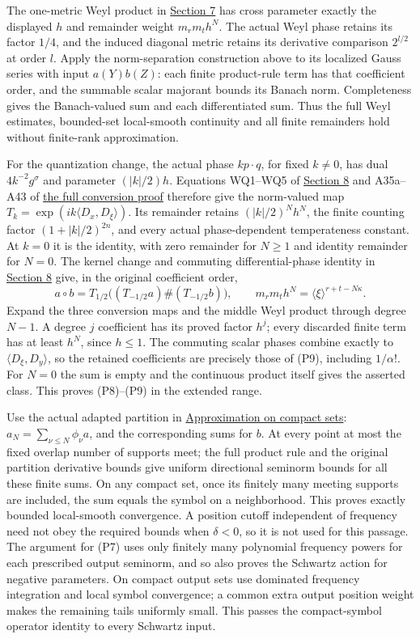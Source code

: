 \documentclass[
  11pt,
]{article}
\begin{document}
The one-metric Weyl product in
\href{weyl-metric-products.pdf\#section*.72}{Section
7} has cross parameter exactly the displayed \(h\) and remainder weight
\(m_rm_th^N\). The actual Weyl phase retains its factor \(1/4\), and the
induced diagonal metric retains its derivative comparison \(2^{l/2}\) at
order \(l\). Apply the norm-separation construction above to its
localized Gauss series with input \(a(Y)b(Z)\): each finite product-rule
term has that coefficient order, and the summable scalar majorant bounds
its Banach norm. Completeness gives the Banach-valued sum and each
differentiated sum. Thus the full Weyl estimates, bounded-set
local-smooth continuity and all finite remainders hold without
finite-rank approximation.

For the quantization change, the actual phase \(kp\cdot q\), for fixed
\(k\ne0\), has dual \(4k^{-2}g^\sigma\) and parameter \((|k|/2)h\).
Equations WQ1--WQ5 of
\href{weyl-metric-products.pdf\#section*.88}{Section
8} and A35a--A43 of
\href{weyl-covariance-action.pdf\#section*.49}{the
full conversion proof} therefore give the norm-valued map
\(T_k=\exp(ik\langle D_x,D_\xi\rangle)\). Its remainder retains
\((|k|/2)^Nh^N\), the finite counting factor \((1+|k|/2)^{2n}\), and
every actual phase-dependent temperateness constant. At \(k=0\) it is
the identity, with zero remainder for \(N\geq1\) and identity remainder
for \(N=0\). The kernel change and commuting differential-phase identity
in
\href{weyl-covariance-action.pdf\#section*.59}{Section
8} give, in the original coefficient order, \[
 a\circ b=T_{1/2}\big((T_{-1/2}a)\#(T_{-1/2}b)\big),
 \qquad m_rm_th^N=\langle\xi\rangle^{r+t-N\kappa}.
 \tag{P9e}
\] Expand the three conversion maps and the middle Weyl product through
degree \(N-1\). A degree \(j\) coefficient has its proved factor
\(h^j\); every discarded finite term has at least \(h^N\), since
\(h\leq1\). The commuting scalar phases combine exactly to
\(\langle D_\xi,D_y\rangle\), so the retained coefficients are precisely
those of (P9), including \(1/\alpha!\). For \(N=0\) the sum is empty and
the continuous product itself gives the asserted class. This proves
(P8)--(P9) in the extended range.

Use the actual adapted partition in
\href{metric-localization.pdf\#section*.28}{Approximation
on compact sets}: \(a_N=\sum_{\nu\leq N}\phi_\nu a\), and the
corresponding sums for \(b\). At every point at most the fixed overlap
number of supports meet; the full product rule and the original
partition derivative bounds give uniform directional seminorm bounds for
all these finite sums. On any compact set, once its finitely many
meeting supports are included, the sum equals the symbol on a
neighborhood. This proves exactly bounded local-smooth convergence. A
position cutoff independent of frequency need not obey the required
bounds when \(\delta<0\), so it is not used for this passage. The
argument for (P7) uses only finitely many polynomial frequency powers
for each prescribed output seminorm, and so also proves the Schwartz
action for negative parameters. On compact output sets use dominated
frequency integration and local symbol convergence; a common extra
output position weight makes the remaining tails uniformly small. This
passes the compact-symbol operator identity to every Schwartz input.
\end{document}

